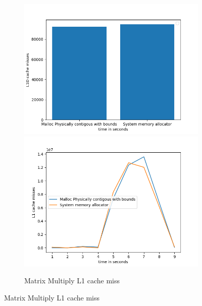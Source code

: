\begin{figure}
  \begin{subfigure}{\linewidth}
    \includegraphics[width=.5\linewidth]{BenchmarkRuns/MatrixMultiply/ll_200_MatrixMultiply.png}\hfill
    \includegraphics[width=.5\linewidth]{BenchmarkRuns/MatrixMultiply/l1_1000_MatrixMultiply.png}
  \caption{Matrix Multiply L1 cache miss}
  \end{subfigure}\par\medskip
\end{figure}

